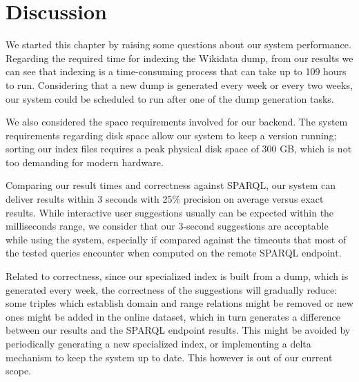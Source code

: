 
\section{Discussion}

We started this chapter by raising some questions about our system performance. Regarding the required time for indexing the Wikidata dump, from our results we can see that indexing is a time-consuming process that can take up to 109 hours to run. Considering that a new dump is generated every week or every two weeks, our system could be scheduled to run after one of the dump generation tasks.

We also considered the space requirements involved for our backend. The system requirements regarding disk space allow our system to keep a version running; sorting our index files requires a peak physical disk space of 300 GB, which is not too demanding for modern hardware.

Comparing our result times and correctness against SPARQL, our system can deliver results within 3 seconds with 25\% precision on average versus exact results. While interactive user suggestions usually can be expected within the milliseconds range, we consider that our 3-second suggestions are acceptable while using the system, especially if compared against the timeouts that most of the tested queries encounter when computed on the remote SPARQL endpoint.

Related to correctness, since our specialized index is built from a dump, which is generated every week, the correctness of the suggestions will gradually reduce: some triples which establish  domain and range relations might be removed or new ones might be added in the online dataset, which in turn generates a difference between our results and the SPARQL endpoint results. This might be avoided by periodically generating a new specialized index, or implementing a delta mechanism to keep the system up to date. This however is out of our current scope.
